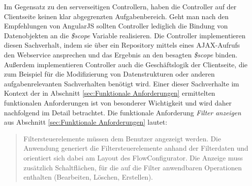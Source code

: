 Im Gegensatz zu den serverseitigen Controllern, haben die Controller auf der Clientseite keinen klar abgegrenzten Aufgabenbereich. Geht man nach den Empfehlungen von AngularJS sollten Controller lediglich die Bindung von Datenobjekten an die \emph{\$scope} Variable realisieren. Die Controller implementieren diesen Sachverhalt, indem sie über ein Repository mittels eines \ac{AJAX}-Aufrufs den Webservice ansprechen und das Ergebnis an den besagten \emph{\$scope} binden. Außerdem implementieren Controller auch die Geschäftslogik der Clientseite, die zum Beispiel für die Modifizierung von Datenstrukturen oder anderen aufgabenrelevanten Sachverhalten benötigt wird. Einer dieser Sachverhalte im Kontext der in Abschnitt \ref{sec:Funktionale Anforderungen} ermittelten funktionalen Anforderungen ist von besonderer Wichtigkeit und wird daher nachfolgend im Detail betrachtet. Die funktionale Anforderung \glqq{}\emph{Filter anzeigen}\grqq{} aus Abschnitt \ref{sec:Funktionale Anforderungen} lautet: 
\begin{quote}
Filtersteuerelemente müssen dem Benutzer angezeigt werden. Die Anwendung generiert die Filtersteuerelemente anhand der Filterdaten und orientiert sich dabei am Layout des FlowConfigurator. Die Anzeige muss zusätzlich Schaltflächen, für die auf die Filter anwendbaren Operationen enthalten (Bearbeiten, Löschen, Erstellen).
\end{quote}
